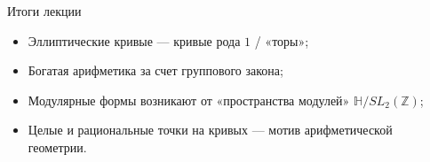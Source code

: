 \documentclass[serif, aspectratio=169]{beamer}
\begin{document}
\begin{frame}{Итоги лекции}
    \begin{itemize}
        \item Эллиптические кривые --- кривые рода $1$ / «торы»;
        \item Богатая арифметика за счет группового закона;
        \item Модулярные формы возникают от «пространства модулей» $\mathbb{H}/SL_2(\mathbb{Z})$;
        \item Целые и рациональные точки на кривых --- мотив арифметической геометрии.
    \end{itemize}
    \note{
        \begin{itemize}
            \item ---
        \end{itemize}
    }
\end{frame}

\end{document}
